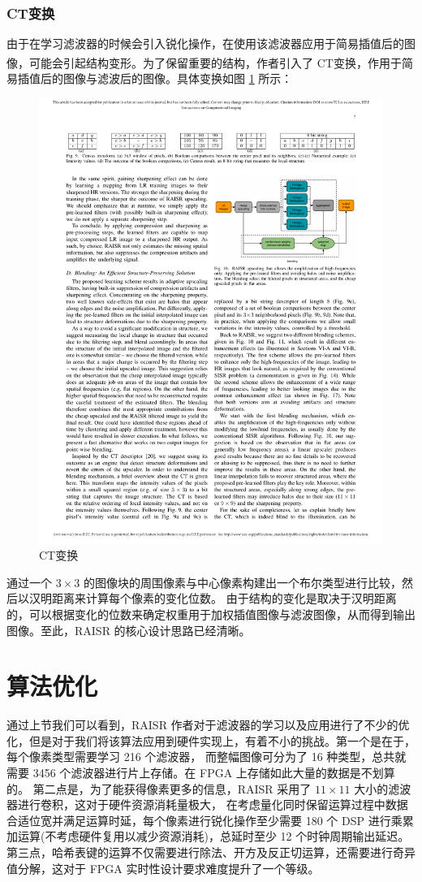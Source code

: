 \documentclass[12pt, a4paper, oneside]{ctexbook}
\begin{document}
	\subsection{CT变换}
	由于在学习滤波器的时候会引入锐化操作，在使用该滤波器应用于简易插值后的图像，可能会引起结构变形。为了保留重要的结构，作者引入了 CT变换\textsuperscript{\cite{7}}，作用于简易插值后的图像与滤波后的图像。具体变换如图 \ref{CT_tran} 所示：
		\begin{figure}[h]
		\centering
		\includegraphics[scale=0.88]{./pic/CT.pdf}
		\caption{CT变换}
		\label{CT_tran}
		\end{figure}
	通过一个 $3\times 3$ 的图像块的周围像素与中心像素构建出一个布尔类型进行比较，然后以汉明距离来计算每个像素的变化位数。
	由于结构的变化是取决于汉明距离的，可以根据变化的位数来确定权重用于加权插值图像与滤波图像，从而得到输出图像。至此，RAISR 的核心设计思路已经清晰。
	
	\chapter{算法优化}
	通过上节我们可以看到，RAISR 作者对于滤波器的学习以及应用进行了不少的优化，但是对于我们将该算法应用到硬件实现上，有着不小的挑战。第一个是在于，每个像素类型需要学习 216 个滤波器，
	而整幅图像可分为了 16 种类型，总共就需要 3456 个滤波器进行片上存储。在 FPGA 上存储如此大量的数据是不划算的。
	第二点是，为了能获得像素更多的信息，RAISR 采用了 $11\times11$ 大小的滤波器进行卷积，这对于硬件资源消耗量极大，
	在考虑量化同时保留运算过程中数据合适位宽并满足运算时延，每个像素进行锐化操作至少需要 180 个 DSP 进行乘累加运算(不考虑硬件复用以减少资源消耗)，总延时至少 12 个时钟周期输出延迟。
	第三点，哈希表键的运算不仅需要进行除法、开方及反正切运算，还需要进行奇异值分解，这对于 FPGA 实时性设计要求难度提升了一个等级。
\end{document}
